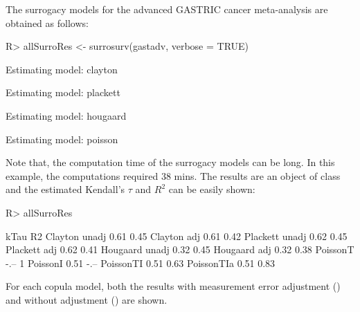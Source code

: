 \documentclass[article,shortnames, nojss]{jss}\usepackage[]{graphicx}\usepackage[]{color}
\begin{document}
  
  The surrogacy models for the advanced GASTRIC cancer meta-analysis
  are obtained as follows:
\begin{Schunk}
\begin{Sinput}
R> allSurroRes <-  surrosurv(gastadv, verbose = TRUE)
\end{Sinput}
\begin{Soutput}
Estimating model: clayton
\end{Soutput}
\begin{Soutput}
Estimating model: plackett
\end{Soutput}
\begin{Soutput}
Estimating model: hougaard
\end{Soutput}
\begin{Soutput}
Estimating model: poisson
\end{Soutput}
\end{Schunk}
Note that, the computation time of the surrogacy models can be long.
In this example, the computations required
38
mins.
The results are an object of class 
and the estimated Kendall's $\tau$ and $R^2$ can be easily shown:
\begin{Schunk}
\begin{Sinput}
R> allSurroRes
\end{Sinput}
\begin{Soutput}
               kTau R2  
Clayton unadj  0.61 0.45
Clayton adj    0.61 0.42
Plackett unadj 0.62 0.45
Plackett adj   0.62 0.41
Hougaard unadj 0.32 0.45
Hougaard adj   0.32 0.38
PoissonT       -.-- 1   
PoissonI       0.51 -.--
PoissonTI      0.51 0.63
PoissonTIa     0.51 0.83
\end{Soutput}
\end{Schunk}
For each copula model,
both the results with measurement error adjustment ()
and without adjustment () are shown.
\end{document}
